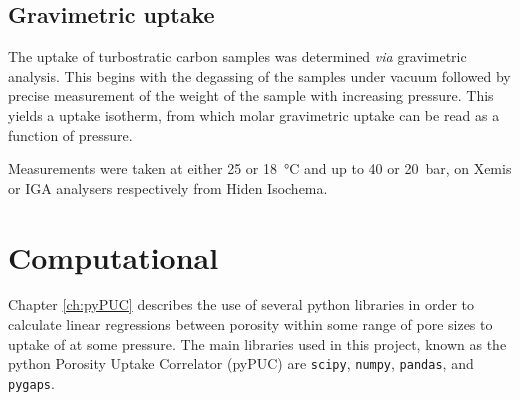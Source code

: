 \begin{comment}
	\begin{enumerate}[label=(\arabic*)]
		\item The intercept of the original \acrshort{bet} transform must be positive, as a negative intercept would yield a negative value for $c$.
		\item The range selected must correspond to a region of the Rouquerol transform where $Q \left(1 - \frac{P}{P_0} \right)$ constantly increases with $\frac{P}{P_0}$.
		\item $Q_m$ as determined from (1) and (2) can be found in the region of the isotherm selected.\citep{Rouquerol2007Is} 
	\end{enumerate}

\paragraph{In this work} All isotherms were measured on a 3flex analyser (Micromeritics). $A_{BET}$ and total pore volume ($V_t$) were determined using the Rouquerol method (where appropriate), and the single point method respectively. Classical determination of \gls{micropore} volume and surface area were determined using t-plot, with a carbon black STSA thickness curve. All \acrshortpl{psd} are derived using the 2D-NLDFT heterogeneous surface kernel.\citep{Jagiello20132D}.
\end{comment}

\subsection{\texorpdfstring{Gravimetric  uptake}{Gravimetric CO2 uptake}}
The  uptake of \gls{turbostratic carbon} samples was determined \textit{via} gravimetric analysis. This begins with the degassing of the samples under vacuum followed by precise measurement of the weight of the sample with increasing  pressure. This yields a  uptake isotherm, from which molar gravimetric uptake can be read as a function of pressure.

Measurements were taken at either \num{25} or \qty{18}{\degreeCelsius} and up to \num{40} or \qty{20}{\bar}, on Xemis or IGA analysers respectively from Hiden Isochema. 

\section{Computational}
Chapter \ref{ch:pyPUC} describes the use of several python libraries in order to calculate linear regressions between porosity within some range of pore sizes to uptake of  at some pressure. The main libraries used in this project, known as the python Porosity Uptake Correlator (pyPUC) are \verb|scipy|,\citep{SciPy2020} \verb|numpy|,\citep{numpy2022} \verb|pandas|,\citep{pandas2010} and \verb|pygaps|.\citep{Iacomi2019pyGAPS}

